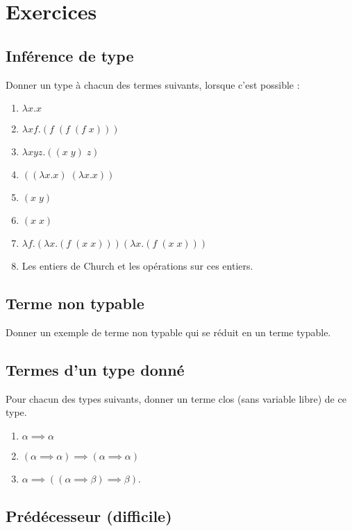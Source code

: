 \documentclass[11pt, a4paper]{article}
\begin{document}
\section{Exercices}
\label{sec:org5696ae6}

\subsection{Inférence de type}
\label{sec:org955c558}
Donner un type à chacun des termes suivants, lorsque c'est possible :
\begin{multicols}{2}

\begin{enumerate}
\item \(\lambda x. x\)
\item \(\lambda xf. (f\; (f\; (f\; x)))\)
\item \(\lambda xyz. ((x\; y)\; z)\)
\item \(((\lambda x. x)\; (\lambda x. x))\)
\item \((x\; y)\)
\item \((x\; x)\)
\item \(\lambda f.(\lambda x.(f\; (x\; x))) (\lambda x.(f\; (x\; x)))\)
\item Les entiers de Church et les opérations sur ces entiers.
\end{enumerate}

\end{multicols}


\subsection{Terme non typable}
\label{sec:org50383b0}
Donner un exemple de terme non typable qui se réduit en un terme
typable.

\subsection{Termes d'un type donné}
\label{sec:orga64521e}
Pour chacun des types suivants, donner un terme clos (sans variable libre) de ce type.
\begin{enumerate}
\item \(\alpha\implies\alpha\)
\item \((\alpha\implies\alpha)\implies(\alpha\implies\alpha)\)
\item \(\alpha\implies((\alpha\implies\beta)\implies\beta)\).
\end{enumerate}


\subsection{Prédécesseur (difficile)}
\label{sec:org8d1e0ce}
\end{document}
